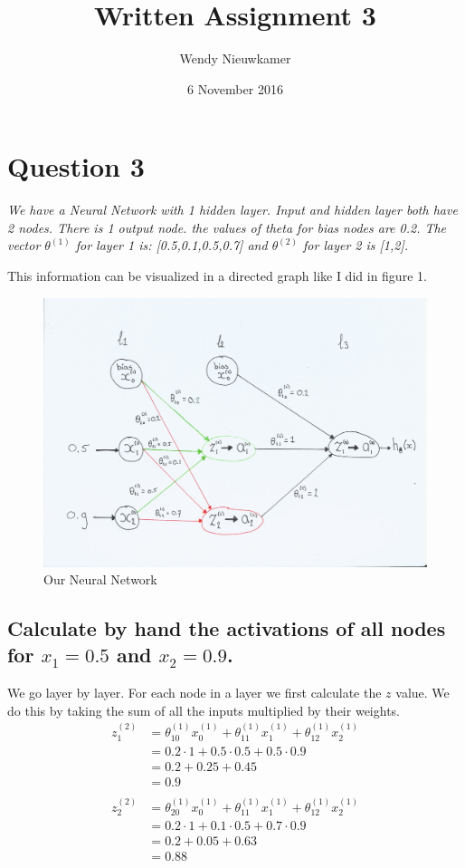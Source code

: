 \documentclass{article}
\title {Written Assignment 3}
\date{6 November 2016}
\author{Wendy Nieuwkamer}
\begin{document}
\maketitle

\section{Question 3}
\textit{We have a Neural Network with 1 hidden layer. Input and hidden layer both have 2 nodes. There is 1 output node. the values of theta for bias nodes are 0.2.
The vector $\theta^{(1)}$ for layer 1 is: [0.5,0.1,0.5,0.7] and $\theta^{(2)}$ for layer 2 is [1,2].}

This information can be visualized in a directed graph like I did in figure 1.

\begin{figure} [h!]
	\includegraphics[width=\linewidth]{NeuralNetwork.JPG}
	\caption{Our Neural Network}
	\label{fig:network}
\end{figure}

\subsection{Calculate by hand the activations of all nodes for $x_1 = 0.5$ and $x_2 = 0.9$. }

We go layer by layer. For each node in a layer we first calculate the $z$ value. We do this by taking the sum of all the inputs multiplied by their weights. 
\begin{align*}
z^{(2)}_1 &= \theta_{10}^{(1)}x_0^{(1)} +  \theta_{11}^{(1)}x_1^{(1)} +  \theta_{12}^{(1)}x_2^{(1)} \\
&= 0.2 \cdot 1 + 0.5 \cdot 0.5 + 0.5 \cdot 0.9 \\
&= 0.2 + 0.25 + 0.45 \\
&= 0.9 \\
 \\
z^{(2)}_2 &= \theta_{20}^{(1)}x_0^{(1)} +  \theta_{11}^{(1)}x_1^{(1)} +  \theta_{12}^{(1)}x_2^{(1)} \\
&=0.2 \cdot 1 + 0.1 \cdot 0.5 + 0.7 \cdot 0.9 \\
&= 0.2 + 0.05 + 0.63 \\
&= 0.88
\end{align*}
\end{document}
